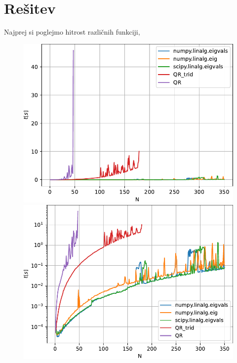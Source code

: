 \section{Rešitev}
Najprej si poglejmo hitrost različnih funkciji,

\begin{figure}
    \centering
    \includegraphics{pdfs/t(N).pdf}
    \includegraphics{pdfs/t(N)log.pdf}
\end{figure}